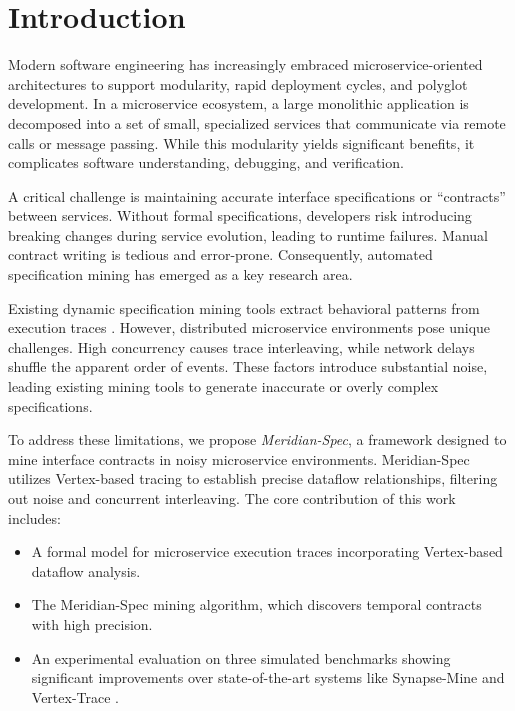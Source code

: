 \section{Introduction}
Modern software engineering has increasingly embraced microservice-oriented architectures to support modularity, rapid deployment cycles, and polyglot development. In a microservice ecosystem, a large monolithic application is decomposed into a set of small, specialized services that communicate via remote calls or message passing. While this modularity yields significant benefits, it complicates software understanding, debugging, and verification.

A critical challenge is maintaining accurate interface specifications or ``contracts'' between services. Without formal specifications, developers risk introducing breaking changes during service evolution, leading to runtime failures. Manual contract writing is tedious and error-prone. Consequently, automated specification mining has emerged as a key research area.

Existing dynamic specification mining tools extract behavioral patterns from execution traces \cite{thompson2021behavioral}. However, distributed microservice environments pose unique challenges. High concurrency causes trace interleaving, while network delays shuffle the apparent order of events. These factors introduce substantial noise, leading existing mining tools to generate inaccurate or overly complex specifications.

To address these limitations, we propose \emph{Meridian-Spec}, a framework designed to mine interface contracts in noisy microservice environments. Meridian-Spec utilizes Vertex-based tracing to establish precise dataflow relationships, filtering out noise and concurrent interleaving. The core contribution of this work includes:
\begin{itemize}
  \item A formal model for microservice execution traces incorporating Vertex-based dataflow analysis.
  \item The Meridian-Spec mining algorithm, which discovers temporal contracts with high precision.
  \item An experimental evaluation on three simulated benchmarks showing significant improvements over state-of-the-art systems like Synapse-Mine \cite{williams2021synapse} and Vertex-Trace \cite{zhang2023vertex}.
\end{itemize}

